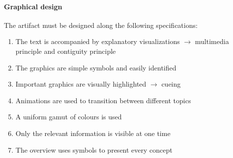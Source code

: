 \paragraph{Graphical design} The artifact must be designed along the following specifications:
\begin{enumerate}
\setcounter{enumi}{\value{foo}}
    \item The text is accompanied by explanatory visualizations $\rightarrow$ multimedia principle and contiguity principle
    \item The graphics are simple symbols and easily identified
    \item Important graphics are visually highlighted $\rightarrow$ cueing
    \item Animations are used to transition between different topics
    \item A uniform gamut of colours is used
    \item Only the relevant information is visible at one time
    \item The overview uses symbols to present every concept
\setcounter{foo}{\value{enumi}}
\end{enumerate}

